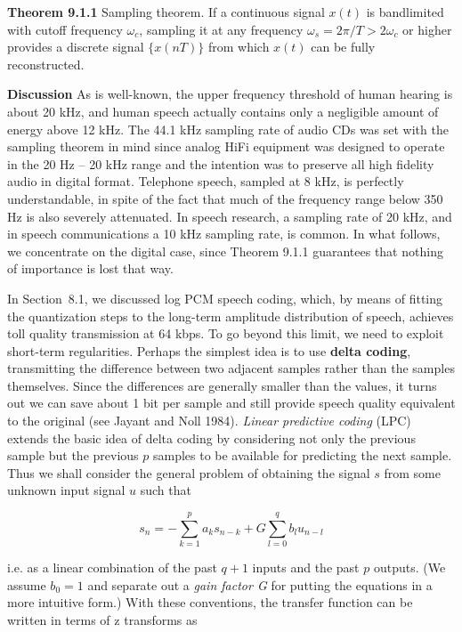 \smallskip
\noindent
{\bf Theorem 9.1.1} Sampling theorem. If a continuous signal $x(t)$ is
bandlimited with cutoff frequency $\omega_c$, sampling it at any frequency
$\omega_s = 2\pi/T > 2\omega_c$ or higher provides a discrete signal
$\{x(nT)\}$ from which $x(t)$ can be fully reconstructed. 

\smallskip
\noindent
{\bf Discussion} As is well-known, the upper frequency threshold of human
hearing is about 20 kHz, and human speech actually contains only a negligible
amount of energy above 12 kHz. The 44.1 kHz sampling rate of audio CDs was set
with the sampling theorem in mind since analog HiFi equipment was designed to
operate in the 20 Hz -- 20 kHz range and the intention was to preserve all high
fidelity audio in digital format. Telephone speech, sampled at 8 kHz, is
perfectly understandable, in spite of the fact that much of the frequency
range below 350 Hz is also severely attenuated. In speech research, a sampling
rate of 20 kHz, and in speech communications a 10 kHz sampling rate, is common.
In what follows, we concentrate on the digital case, since Theorem 9.1.1
guarantees that nothing of importance is lost that way.

In Section~8.1, we discussed log PCM speech coding, which, by means of fitting
the quantization steps to the long-term amplitude distribution of speech,
achieves toll quality transmission at 64 kbps. To go beyond this limit, we
need to exploit short-term regularities. Perhaps the simplest idea is to use
{\bf delta coding}, transmitting the difference between two adjacent samples
rather than the samples themselves. Since the differences are generally
smaller than the values, it turns out we can save about 1 bit per sample and
still provide speech quality equivalent to the original (see Jayant and Noll
1984).\nocite{Jayant:1984} {\it Linear predictive coding} (LPC) extends the basic idea of delta coding by
considering not only the previous sample but the previous $p$ samples to be
available for predicting the next sample. Thus we shall consider the general
problem of obtaining the signal $s$ from some unknown input signal $u$ such
that

\vspace*{-2.5mm}
\begin{equation}
s_n=-\sum_{k=1}^p a_ks_{n-k}+G\sum_{l=0}^qb_lu_{n-l}
\end{equation}

\noindent 
i.e. as a linear combination of the past $q+1$ inputs and the past $p$ 
outputs. (We assume $b_0=1$ and separate out a {\it gain factor G} for 
putting the equations in a more intuitive form.) With these conventions,
the transfer function can be written in terms of z transforms as

